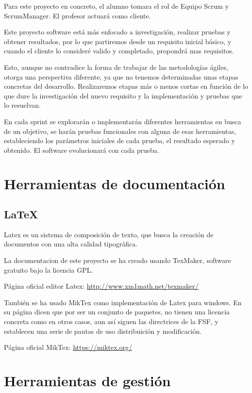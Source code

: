 Para este proyecto en concreto, el alumno tomara el rol de Equipo Scrum y ScrumManager. El profesor actuará como cliente.

Este proyecto software está más enfocado a investigación, realizar pruebas y obtener resultados, por lo que partiremos desde un requisito inicial básico, y cuando el cliente lo consideré valido y completado, propondrá mas requisitos. 

Esto, aunque no contradice la forma de trabajar de las metodologías ágiles, otorga una perspectiva diferente, ya que no tenemos determinadas unas etapas concretas del desarrollo. Realizaremos etapas más o menos cortas en función de lo que dure la investigación del nuevo requisito y la implementación y pruebas que lo resuelvan.

En cada sprint se explorarán o implementarán diferentes herramientas en busca de un objetivo, se harán pruebas funcionales con alguna de esas herramientas, estableciendo los parámetros iniciales de cada prueba, el resultado esperado y obtenido. El software evolucionará con cada prueba.

\section{Herramientas de documentación}

\subsection{LaTeX}

Latex es un sistema de composición de texto, que busca la creación de documentos con una alta calidad tipográfica.

La documentacion de este proyecto se ha creado usando TexMaker, software gratuito bajo la licencia GPL.

Página oficial editor Latex: \url{http://www.xm1math.net/texmaker/}

También se ha usado MikTex como implementación de Latex para windows. En su página dicen que por ser un conjunto de paquetes, no tienen una licencia concreta como en otros casos, aun así siguen las directrices de la FSF\cite{fsf}, y establecen una serie de pautas de uso distribuición y modificación.

Página oficial MikTex: \url{https://miktex.org/}

\section{Herramientas de gestión}

